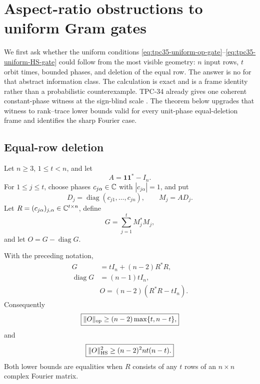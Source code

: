\section{Aspect-ratio obstructions to uniform Gram gates}
\label{sec:tpc35-uniform-gram}

We first ask whether the uniform conditions
\eqref{eq:tpc35-uniform-op-gate}--\eqref{eq:tpc35-uniform-HS-gate}
could follow from the most visible geometry: \(n\) input rows, \(t\) orbit
times, bounded phases, and deletion of the equal row.  The answer is no
for that abstract information class.  The calculation is exact and is a
frame identity rather than a probabilistic counterexample.
TPC-34 already gives one coherent constant-phase witness at the
sign-blind scale \citep{WangTPC34}.  The theorem below upgrades that
witness to rank--trace lower bounds valid for every unit-phase
equal-deletion frame and identifies the sharp Fourier case.

\subsection{Equal-row deletion}

Let \(n\ge3\), \(1\le t<n\), and let
\begin{equation}
 A=\mathbf1\mathbf1^*-I_n.
 \label{eq:tpc35-equal-deletion-A}
\end{equation}
For \(1\le j\le t\), choose phases \(c_{j\alpha}\in\mathbb C\) with
\(|c_{j\alpha}|=1\), and put
\begin{equation}
 D_j=\operatorname{diag}(c_{j1},\ldots,c_{jn}),\qquad
 M_j=AD_j.
 \label{eq:tpc35-phase-matrices}
\end{equation}
Let \(R=(c_{j\alpha})_{j,\alpha}\in\mathbb C^{t\times n}\), define
\begin{equation}
 G=\sum_{j=1}^tM_j^*M_j,
 \label{eq:tpc35-abstract-Gram}
\end{equation}
and let \(O=G-\operatorname{diag}G\).

\begin{theorem}
\label{thm:tpc35-equal-deletion-Gram}
With the preceding notation,
\begin{align}
 G&=tI_n+(n-2)R^*R,
 \label{eq:tpc35-G-exact}\\
 \operatorname{diag}G&=(n-1)tI_n,
 \label{eq:tpc35-G-diagonal}\\
 &\boxed{O=(n-2)(R^*R-tI_n).}
 \label{eq:tpc35-O-exact}
\end{align}
Consequently
\begin{equation}
 \boxed{
 \|O\|_{\operatorname{op}}\ge(n-2)\max\{t,n-t\},}
 \label{eq:tpc35-O-op-lower}
\end{equation}
and
\begin{equation}
 \boxed{
 \|O\|_{\operatorname{HS}}^2\ge(n-2)^2nt(n-t).}
 \label{eq:tpc35-O-HS-lower}
\end{equation}
Both lower bounds are equalities when \(R\) consists of any \(t\) rows of
an \(n\times n\) complex Fourier matrix.
\end{theorem}

